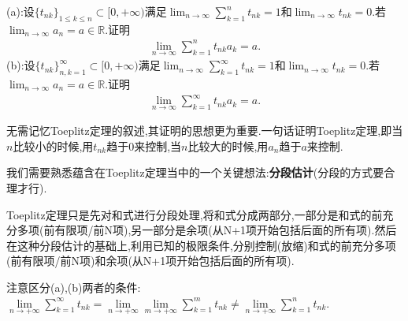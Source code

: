 \documentclass[../../main.tex]{subfiles}%
\begin{document}
\begin{theorem}[Toeplitz定理]\label{theorem:Toeplitz定理}
(a):设\(\{t_{nk}\}_{1\leqslant k\leqslant n} \subset [0, +\infty)\)满足\(\lim_{n \to \infty} \sum\limits_{k = 1}^{n} t_{nk} = 1\)和\(\lim_{n \to \infty} t_{nk} = 0\).若\(\lim_{n \to \infty} a_n = a \in \mathbb{R}\).证明
\begin{align}\label{equation:2.5}
\lim_{n \to \infty} \sum\limits_{k = 1}^{n} t_{nk}a_k = a.
\end{align}
(b):设\(\{t_{nk}\}_{n,k = 1}^{\infty} \subset [0, +\infty)\)满足\(\lim_{n \to \infty} \sum\limits_{k = 1}^{\infty} t_{nk} = 1\)和\(\lim_{n \to \infty} t_{nk} = 0\).若\(\lim_{n \to \infty} a_n = a \in \mathbb{R}\).证明
\begin{align}\label{equation:2.6}
\lim_{n \to \infty} \sum\limits_{k = 1}^{\infty} t_{nk}a_k = a.
\end{align}
\end{theorem}
\begin{note}
无需记忆Toeplitz定理的叙述,其证明的思想更为重要.一句话证明Toeplitz定理,即当\(n\)比较小的时候,用\(t_{nk}\)趋于\(0\)来控制,当\(n\)比较大的时候,用\(a_n\)趋于\(a\)来控制.

我们需要熟悉蕴含在Toeplitz定理当中的一个关键想法:\textbf{分段估计}(分段的方式要合理才行).

Toeplitz定理只是先对和式进行分段处理,将和式分成两部分,一部分是和式的前充分多项(前有限项/前N项),另一部分是余项(从N+1项开始包括后面的所有项).然后在这种分段估计的基础上,利用已知的极限条件,分别控制(放缩)和式的前充分多项(前有限项/前N项)和余项(从N+1项开始包括后面的所有项).
\end{note}
\begin{remark}
注意区分(a),(b)两者的条件:$\underset{n\rightarrow +\infty}{\lim}\sum\limits_{k=1}^{\infty}{t_{nk}}=\underset{n\rightarrow +\infty}{\lim}\underset{m\rightarrow +\infty}{\lim}\sum\limits_{k=1}^m{t_{nk}}\ne \underset{n\rightarrow +\infty}{\lim}\sum\limits_{k=1}^n{t_{nk}}$.
\end{remark}
\end{document}
